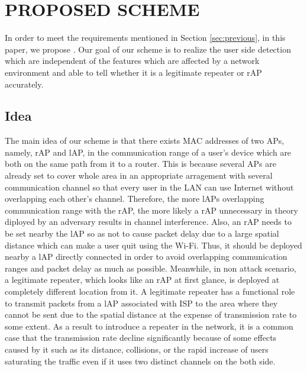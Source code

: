\documentclass[conference]{IEEEtran}
\begin{document}
\section{PROPOSED SCHEME}
In order to meet the requirements mentioned in Section \ref{sec:previous}, in this paper, we propose \ti.  
Our goal of our scheme is to realize the user side detection which are independent of the features which are affected by a network environment and able to tell whether it is a legitimate repeater or rAP accurately.

\subsection{Idea}
The main idea of our scheme is that there exists MAC addresses of two APs, namely, rAP and lAP, in the communication range of a user's device which are both on the same path from it to a router.
This is because several APs are already set to cover whole area in an appropriate arragement with several communication channel so that every user in the LAN can use Internet without overlapping each other's channel.
Therefore, the more lAPs overlapping communication range with the rAP, the more likely a rAP unnecessary in theory diployed by an adversary results in channel interference.
Also, an rAP needs to be set nearby the lAP so as not to cause packet delay due to a large spatial distance which can make a user quit using the Wi-Fi.
Thus, it should be deployed nearby a lAP directly connected in order to avoid overlapping communication ranges and packet delay as much as possible.
Meanwhile, in non attack scenario, a legitimate repeater, which looks like an rAP at first glance, is deployed at completely different location from it.
A legitimate repeater has a functional role to transmit packets from a lAP associated with ISP to the area where they cannot be sent due to the spatial distance at the expense of transmission rate to some extent.
As a result to introduce a repeater in the network, it is a common case that the transmission rate decline significantly because of some effects caused by it such as its distance, collisions, or the rapid increase of users saturating the traffic even if it uses two distinct channels on the both side. 
\end{document}
